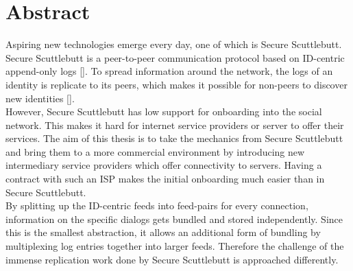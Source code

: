 \chapter{Abstract}
Aspiring new technologies emerge every day, one of which is Secure Scuttlebutt. Secure Scuttlebutt is a peer-to-peer communication protocol based on ID-centric append-only logs []. To spread information around the network, the logs of an identity is replicate to its peers, which makes it possible for non-peers to discover new identities [].
\\

However, Secure Scuttlebutt has low support for onboarding into the social network. This makes it hard for internet service providers or server to offer their services. The aim of this thesis is to take the mechanics from Secure Scuttlebutt and bring them to a more commercial environment by introducing new intermediary service providers which offer connectivity to servers. Having a contract with such an ISP makes the initial onboarding much easier than in Secure Scuttlebutt. 
\\

By splitting up the ID-centric feeds into feed-pairs for every connection, information on the specific dialogs gets bundled and stored independently. Since this is the smallest abstraction, it allows an additional form of bundling by multiplexing log entries together into larger feeds. Therefore the challenge of the immense replication work done by Secure Scuttlebutt is approached differently. 
